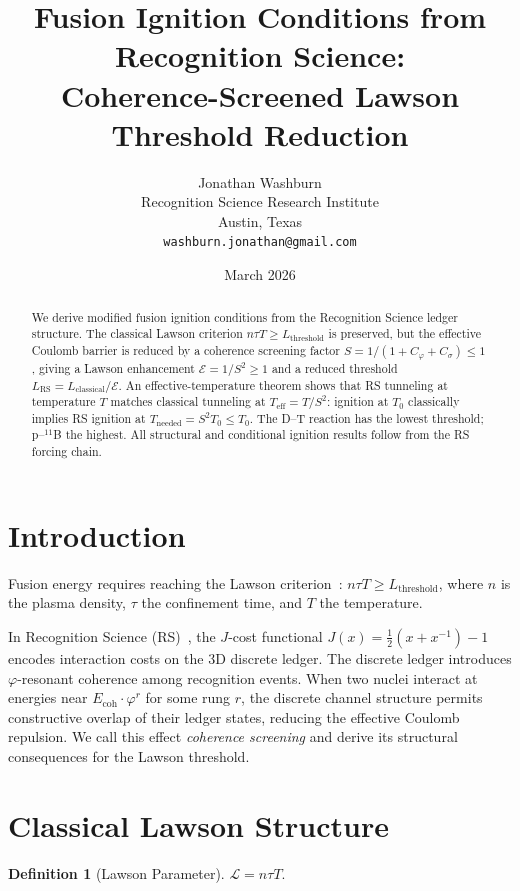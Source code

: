 \documentclass[12pt,a4paper]{article}
\title{Fusion Ignition Conditions from Recognition Science:\\
Coherence-Screened Lawson Threshold Reduction}
\author{Jonathan Washburn\\
Recognition Science Research Institute\\
Austin, Texas\\
\texttt{washburn.jonathan@gmail.com}}
\date{March 2026}
\theoremstyle{definition}
\newtheorem{definition}[theorem]{Definition}
\theoremstyle{remark}
\begin{document}
\maketitle

\begin{abstract}
We derive modified fusion ignition conditions from the Recognition
Science ledger structure.  The classical Lawson criterion
$n\tau T \geq L_{\mathrm{threshold}}$ is preserved, but the effective
Coulomb barrier is reduced by a coherence screening factor
$S = 1/(1 + C_\varphi + C_\sigma) \leq 1$, giving a Lawson
enhancement $\mathcal{E} = 1/S^2 \geq 1$ and a reduced threshold
$L_{\mathrm{RS}} = L_{\mathrm{classical}}/\mathcal{E}$.  An
effective-temperature theorem shows that RS tunneling at temperature
$T$ matches classical tunneling at $T_{\mathrm{eff}} = T/S^2$:
ignition at $T_0$ classically implies RS ignition at
$T_{\mathrm{needed}} = S^2 T_0 \leq T_0$.  The D--T reaction has
the lowest threshold; p--${}^{11}$B the highest.  All structural and
conditional ignition results follow from the RS forcing chain.
\end{abstract}

\section{Introduction}

Fusion energy requires reaching the Lawson criterion~\cite{Lawson}:
$n\tau T \geq L_{\mathrm{threshold}}$, where $n$ is the plasma
density, $\tau$ the confinement time, and $T$ the temperature.

In Recognition Science (RS)~\cite{RS_Axioms}, the $J$-cost
functional $J(x) = \tfrac{1}{2}(x+x^{-1})-1$ encodes interaction
costs on the 3D discrete ledger.  The discrete ledger introduces
$\varphi$-resonant coherence among recognition events.  When
two nuclei interact at energies near $E_{\mathrm{coh}}\cdot\varphi^r$
for some rung $r$, the discrete channel structure permits
constructive overlap of their ledger states, reducing the effective
Coulomb repulsion.  We call this effect \emph{coherence screening}
and derive its structural consequences for the Lawson threshold.

\section{Classical Lawson Structure}

\begin{definition}[Lawson Parameter]
$\mathcal{L} = n\tau T$.
\end{definition}
\end{document}
